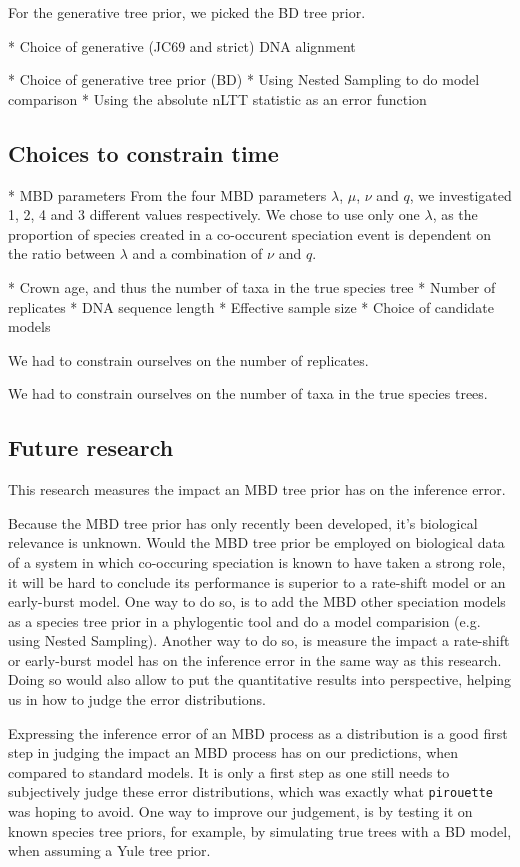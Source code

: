 For the generative tree prior, we picked the BD tree prior.


 * Choice of generative (JC69 and strict) DNA alignment 


 * Choice of generative tree prior (BD)
 * Using Nested Sampling to do model comparison
 * Using the absolute nLTT statistic as an error function

\subsection{Choices to constrain time}

 * MBD parameters
From the four MBD parameters $\lambda$, $\mu$, $\nu$ and $q$,
we investigated 1, 2, 4 and 3 different values respectively.
We chose to use only one $\lambda$, as the proportion of species
created in a co-occurent speciation event is dependent on the ratio
between $\lambda$ and a combination of $\nu$ and $q$.  

 * Crown age, and thus the number of taxa in the true species tree
 * Number of replicates
 * DNA sequence length
 * Effective sample size
 * Choice of candidate models
 
We had to constrain ourselves on the number of replicates.

We had to constrain ourselves on the number of taxa in
the true species trees.

\subsection{Future research}

This research measures the impact an MBD tree prior 
has on the inference error. 

Because the MBD tree prior has only recently been 
developed, it's biological relevance is unknown.
Would the MBD tree prior be employed on biological data of a system
in which co-occuring speciation is known to have taken a strong role,
it will be hard to conclude its performance is superior to a
rate-shift model or an early-burst model. One way to do so, is
to add the MBD other speciation models as a species tree prior
in a phylogentic tool and do a model comparision (e.g. using Nested Sampling).
Another way to do so, is measure the impact a rate-shift or early-burst model
has on the inference error in the same way as this research.
Doing so would also allow to put the quantitative results into perspective,
helping us in how to judge the error distributions. 

Expressing the inference error of an MBD process as a distribution
is a good first step in judging the impact an MBD process has on
our predictions, when compared to standard models. It is only a first
step as one still needs to subjectively judge these error distributions,
which was exactly what \verb;pirouette; was hoping to avoid. 
One way to improve our judgement, is by testing it on known species tree
priors, for example, by simulating true trees with a BD model, when assuming
a Yule tree prior.  
